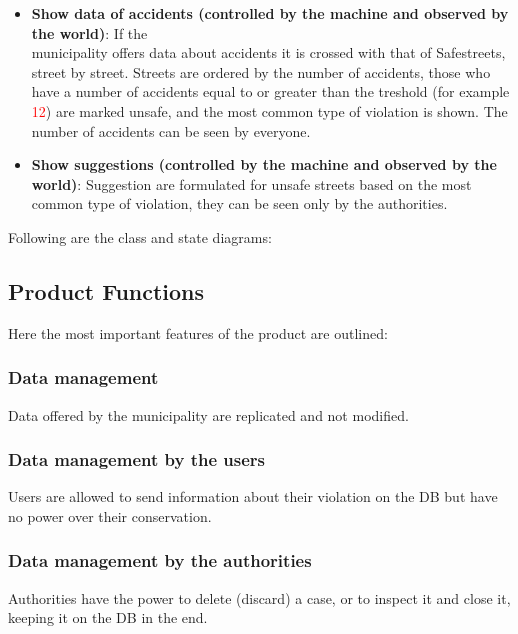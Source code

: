 \begin{itemize}
\item \textbf{Show data of accidents (controlled by the machine and observed by the world)}: If the \\ municipality offers data about accidents it is crossed with that of Safestreets, street by street. Streets are ordered by the number of accidents, those who have a number of accidents equal to or greater than the treshold (for example \textcolor{Red}{12}) are marked unsafe, and the most common type of violation is shown. The number of accidents can be seen by everyone.

\item \textbf{Show suggestions (controlled by the machine and observed by the world)}: Suggestion are formulated for unsafe streets based on the most common type of violation, they can be seen only by the authorities.

\end{itemize}

Following are the class and state diagrams:


\subsection{Product Functions}

Here the most important features of the product are outlined:

\subsubsection{Data management}

Data offered by the municipality are replicated and not modified.

\subsubsection*{Data management by the users}

Users are allowed to send information about their violation on the DB but have no power over their conservation. 

\subsubsection*{Data management by the authorities}

Authorities have the power to delete (discard) a case, or to inspect it and close it, keeping it on the DB in the end. 

